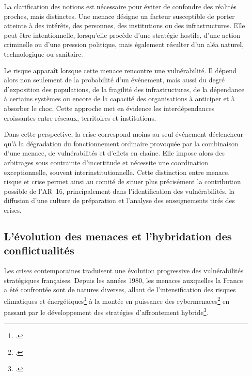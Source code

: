\documentclass[12pt,a4paper]{article}
\newcommand{\ARSeize}{AR~16}
\begin{document}
La clarification des notions est nécessaire pour éviter de confondre des réalités proches, mais distinctes. Une menace désigne un facteur susceptible de porter atteinte à des intérêts, des personnes, des institutions ou des infrastructures. Elle peut être intentionnelle, lorsqu'elle procède d'une stratégie hostile, d'une action criminelle ou d'une pression politique, mais également résulter d'un aléa naturel, technologique ou sanitaire.

Le risque apparaît lorsque cette menace rencontre une vulnérabilité. Il dépend alors non seulement de la probabilité d'un événement, mais aussi du degré d'exposition des populations, de la fragilité des infrastructures, de la dépendance à certains systèmes ou encore de la capacité des organisations à anticiper et à absorber le choc. Cette approche met en évidence les interdépendances croissantes entre réseaux, territoires et institutions.

Dans cette perspective, la crise correspond moins au seul événement déclencheur qu'à la dégradation du fonctionnement ordinaire provoquée par la combinaison d'une menace, de vulnérabilités et d'effets en chaîne. Elle impose alors des arbitrages sous contrainte d'incertitude et nécessite une coordination exceptionnelle, souvent interinstitutionnelle. Cette distinction entre menace, risque et crise permet ainsi au comité de situer plus précisément la contribution possible de l'\ARSeize, principalement dans l'identification des vulnérabilités, la diffusion d'une culture de préparation et l'analyse des enseignements tirés des crises.

\subsection{L'évolution des menaces et l'hybridation des conflictualités}

Les crises contemporaines traduisent une évolution progressive des vulnérabilités stratégiques françaises.
Depuis les années 1980, les menaces auxquelles la France a été confrontée sont de natures diverses, allant de l'intensification des risques climatiques et énergétiques\footcite{AN:2022:Resilience_nationale} à la montée en puissance des cybermenaces\footcite{Berthier_hacktivisme} en passant par le développement des stratégies d'affrontement hybride\footcite{Gere_affrontement_hybride}.
\end{document}
